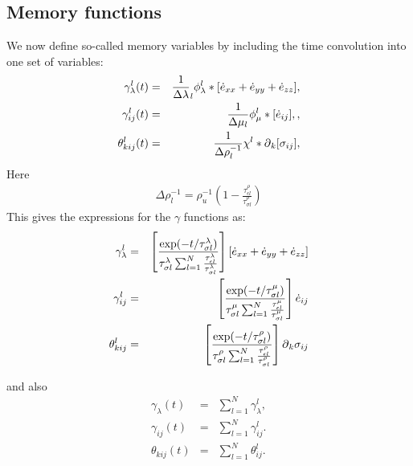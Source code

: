 \documentclass[11pt]{article}
\begin{document}
\subsection*{Memory functions} 
We now define so-called memory variables by including the time convolution into one set of variables:
\begin{eqnarray}
 \gamma^l_{\lambda}(t) & =& \frac{1}{\Delta\lambda}_l \phi^l_{\lambda}*[\dot{e}_{xx}+\dot{e}_{yy}+\dot{e}_{zz}], \nonumber\\
 \gamma^l_{ij}(t) & =& \frac{1}{\Delta\mu_l}\phi^l_{\mu}*[\dot{e}_{ij}],      \nonumber
                           \label{eq:gamma-l}, \\
 \theta^l_{kij}(t) & =& \frac{1}{\Delta\rho^{-1}_l}\chi^l*\mbox{$\partial$}_k[\sigma_{ij}],      \nonumber
                           \label{eq:theta-l}
\end{eqnarray}
Here 
\begin{eqnarray}
  \Delta\rho^{-1}_l = \rho^{-1}_u\left(1-\frac{\tau^{\rho}_{\epsilon l}}{\tau^{\rho}_{\sigma l}}\right)
\end{eqnarray}
This gives the expressions for the $\gamma$ functions as:
\begin{eqnarray}
 \gamma^l_{\lambda}    & = & \left[\frac{\exp(-t/\tau^{\lambda}_{\sigma l})}{\tau^{\lambda}_{\sigma l}
                             \sum_{l=1}^N \frac{\tau^{\lambda}_{\epsilon l}}{\tau^{\lambda}_{\sigma l}}}\right] 
                              [\dot{e}_{xx}+\dot{e}_{yy}+\dot{e}_{zz}] \nonumber\\
 \gamma^l_{ij}    & = & \left[\frac{\exp(-t/\tau^{\mu}_{\sigma l})}{\tau^{\mu}_{\sigma l}
                             \sum_{l=1}^N \frac{\tau^{\mu}_{\epsilon l}}{\tau^{\mu}_{\sigma l}}}\right] 
                              \dot{e}_{ij}\nonumber\\
 \theta^l_{kij}    & = & \left[\frac{\exp(-t/\tau^{\rho}_{\sigma l})}{\tau^{\rho}_{\sigma l}
                             \sum_{l=1}^N \frac{\tau^{\rho}_{\epsilon l}}{\tau^{\rho}_{\sigma l}}}\right] 
                              \mbox{$\partial$}_k \sigma_{ij}\nonumber\\
\end{eqnarray}

and also 
\begin{eqnarray}
  \gamma_{\lambda}(t) & = & \sum_{l=1}^N \gamma^l_{\lambda}, \nonumber\\
  \gamma_{ij}(t)     & = & \sum_{l=1}^N \gamma^l_{ij}.         \nonumber\\
  \theta_{kij}(t)     & = & \sum_{l=1}^N \theta^l_{ij}.         \nonumber\\
                           \label{eq:gamma}
\end{eqnarray}
\end{document}
